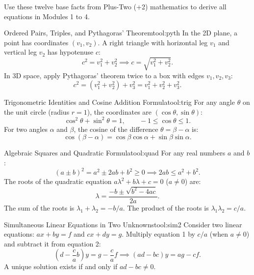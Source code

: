 \documentclass[11pt,a4paper,openany,oneside]{book}
\numberwithin{equation}{chapter}
\newcounter{tool}
\begin{document}
\begin{syll}
Use these twelve base facts from Plus-Two (+2) mathematics to derive all equations in Modules 1 to 4.
\end{syll}

\begin{toolbox}{Ordered Pairs, Triples, and Pythagoras' Theorem}{tool:pyth}
In the 2D plane, a point has coordinates $(v_1, v_2)$. A right triangle with horizontal leg $v_1$ and vertical leg $v_2$ has hypotenuse $c$:
\begin{equation}
c^2 = v_1^2 + v_2^2 \implies c = \sqrt{v_1^2 + v_2^2}.
\end{equation}
In 3D space, apply Pythagoras' theorem twice to a box with edges $v_1, v_2, v_3$:
\begin{equation}
c^2 = (v_1^2 + v_2^2) + v_3^2 = v_1^2 + v_2^2 + v_3^2.
\end{equation}
\end{toolbox}

\begin{toolbox}{Trigonometric Identities and Cosine Addition Formula}{tool:trig}
For any angle $\theta$ on the unit circle (radius $r=1$), the coordinates are $(\cos\theta, \sin\theta)$:
\begin{equation}
\cos^2\theta + \sin^2\theta = 1, \qquad -1 \le \cos\theta \le 1.
\end{equation}
For two angles $\alpha$ and $\beta$, the cosine of the difference $\theta = \beta - \alpha$ is:
\begin{equation}
\cos(\beta - \alpha) = \cos\beta\cos\alpha + \sin\beta\sin\alpha.
\end{equation}
\end{toolbox}

\begin{toolbox}{Algebraic Squares and Quadratic Formula}{tool:quad}
For any real numbers $a$ and $b$:
\begin{equation}
(a \pm b)^2 = a^2 \pm 2ab + b^2 \ge 0 \implies 2ab \le a^2 + b^2.
\end{equation}
The roots of the quadratic equation $a\lambda^2 + b\lambda + c = 0$ ($a\neq 0$) are:
\begin{equation}
\lambda = \frac{-b \pm \sqrt{b^2 - 4ac}}{2a}.
\end{equation}
The sum of the roots is $\lambda_1 + \lambda_2 = -b/a$. The product of the roots is $\lambda_1\lambda_2 = c/a$.
\end{toolbox}

\begin{toolbox}{Simultaneous Linear Equations in Two Unknowns}{tool:sim2}
Consider two linear equations: $ax + by = f$ and $cx + dy = g$.
Multiply equation 1 by $c/a$ (when $a\neq 0$) and subtract it from equation 2:
\begin{equation}
\left(d - \frac{c}{a}b\right)y = g - \frac{c}{a}f \implies (ad - bc)y = ag - cf.
\end{equation}
A unique solution exists if and only if $ad - bc \neq 0$.
\end{toolbox}
\end{document}
